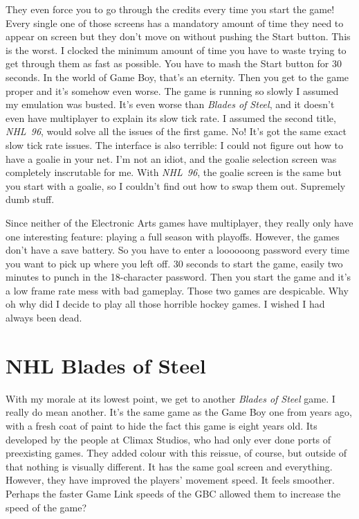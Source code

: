 \documentclass{book}
\let\oldcenter\center
\let\oldendcenter\endcenter
\renewenvironment{center}{\setlength\topsep{0pt}\oldcenter}{\oldendcenter}
\begin{document}
They even force you to go through the credits every time you start the game! Every single one of those screens has a mandatory amount of time they need to appear on screen but they don’t move on without pushing the Start button. This is the worst. I clocked the minimum amount of time you have to waste trying to get through them as fast as possible. You have to mash the Start button for 30 seconds. In the world of Game Boy, that’s an eternity. Then you get to the game proper and it’s somehow even worse. The game is running so slowly I assumed my emulation was busted. It’s even worse than \emph{Blades of Steel}, and it doesn’t even have multiplayer to explain its slow tick rate. I assumed the second title, \emph{NHL 96}, would solve all the issues of the first game. No! It’s got the same exact slow tick rate issues. The interface is also terrible: I could not figure out how to have a goalie in your net. I’m not an idiot, and the goalie selection screen was completely inscrutable for me. With \emph{NHL 96}, the goalie screen is the same but you start with a goalie, so I couldn’t find out how to swap them out. Supremely dumb stuff.

Since neither of the Electronic Arts games have multiplayer, they really only have one interesting feature: playing a full season with playoffs. However, the games don’t have a save battery. So you have to enter a loooooong password every time you want to pick up where you left off. 30 seconds to start the game, easily two minutes to punch in the 18-character password. Then you start the game and it’s a low frame rate mess with bad gameplay. Those two games are despicable. Why oh why did I decide to play all those horrible hockey games. I wished I had always been dead.

\FloatBarrier\needspace{10mm}\section*{NHL Blades of Steel}\nopagebreak[4]

\begin{center}
\vspace{8pt}
\quad\vspace{4pt}
\end{center}

With my morale at its lowest point, we get to another \emph{Blades of Steel} game. I really do mean another. It’s the same game as the Game Boy one from years ago, with a fresh coat of paint to hide the fact this game is eight years old. Its developed by the people at Climax Studios, who had only ever done ports of preexisting games. They added colour with this reissue, of course, but outside of that nothing is visually different. It has the same goal screen and everything. However, they have improved the players’ movement speed. It feels smoother. Perhaps the faster Game Link speeds of the GBC allowed them to increase the speed of the game?
\end{document}
